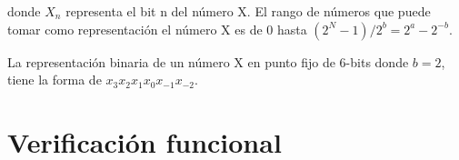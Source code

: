 donde $X_n$ representa el bit n del número X. El rango de números que puede tomar como representación el número X es de 0 hasta $(2^{N}-1)/2^{b}=2^{a}-2^{-b}$.

La representación binaria de un número X en punto fijo de 6-bits donde $b=2$, tiene la forma de $x_{3}x_{2}x_{1}x_{0}x_{-1}x_{-2}$.










\section{Verificación funcional}

